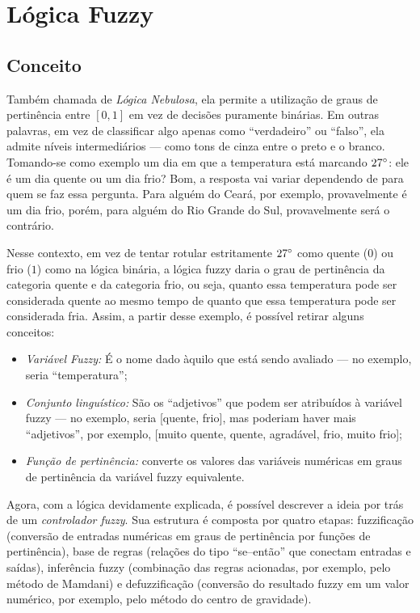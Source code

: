 \section{Lógica Fuzzy}
\subsection{Conceito}
Também chamada de \textit{Lógica Nebulosa}, ela permite a utilização de graus de pertinência entre 
$[0, 1]$ em vez de decisões puramente binárias. Em outras palavras, em vez de classificar algo 
apenas como ``verdadeiro'' ou ``falso'', ela admite níveis intermediários — como tons de cinza entre 
o preto e o branco. Tomando-se como exemplo um dia  
em que a temperatura está marcando $27\degree$: ele é um dia quente ou um dia frio? Bom, a resposta 
vai variar dependendo de para quem se faz essa pergunta. Para alguém do Ceará, 
por exemplo, provavelmente é um dia frio, porém, para alguém  
do Rio Grande do Sul, provavelmente será o contrário.

Nesse contexto, em vez de tentar rotular estritamente 
$27\degree$ como quente ($0$) ou frio ($1$) como na lógica binária, a lógica fuzzy daria o grau de pertinência 
da categoria quente e da categoria frio, ou seja, quanto essa temperatura pode ser considerada quente ao 
mesmo tempo de quanto que essa temperatura pode ser considerada fria. Assim, a partir desse exemplo, 
é possível retirar alguns conceitos:

\begin{itemize}
    \item \emph{Variável Fuzzy:} É o nome dado àquilo que está sendo avaliado — no exemplo, seria ``temperatura'';
    \item \emph{Conjunto linguístico:} São os ``adjetivos'' que podem ser atribuídos à variável fuzzy — no exemplo, 
    seria [quente, frio], mas poderiam haver mais ``adjetivos'', por exemplo, [muito quente, quente, agradável, frio, muito frio];
    \item \emph{Função de pertinência:} converte os valores das variáveis numéricas em graus de pertinência da variável fuzzy equivalente.
\end{itemize}

Agora, com a lógica devidamente explicada, é possível descrever a ideia por trás de um \emph{controlador fuzzy}. 
Sua estrutura é composta por quatro etapas: fuzzificação (conversão de entradas numéricas em graus 
de pertinência por funções de pertinência), base de regras (relações do tipo ``se–então'' que conectam 
entradas e saídas), inferência fuzzy (combinação das regras acionadas, por exemplo, pelo método de 
Mamdani) e defuzzificação (conversão do resultado fuzzy em um valor numérico, por exemplo, pelo 
método do centro de gravidade).

